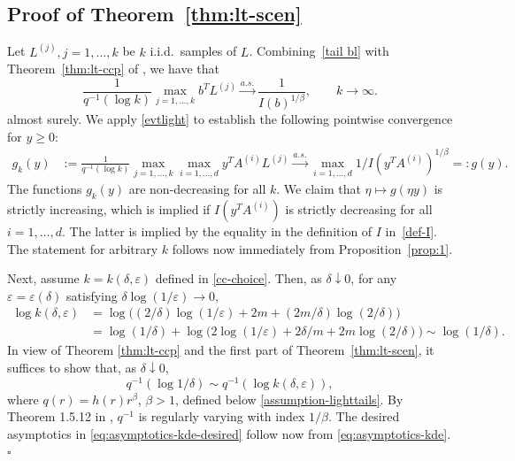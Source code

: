 \documentclass[a4paper, a4wide, 10pt, reqno]{amsart}
\theoremstyle{plain}
\renewcommand{\qed}{\hfill$\square$}
\begin{document}
\subsection{Proof of Theorem~\ref{thm:lt-scen}}
Let $L^{(j)},j=1,...,k$ be $k$ i.i.d.\ samples of $L$.
Combining~\eqref{tail bl} with Theorem~\ref{thm:lt-ccp} of
\cite{Resnick1973}, 
 we have that
\begin{equation}
\label{evtlight}
    \frac 1{q^{-1} (\log k)} \max_{j=1,...,k} b^T L^{(j)}\stackrel{a.s.}{\rightarrow} \frac  1{I(b)^{1/\beta}}, \qquad k\to\infty.
\end{equation}
almost surely.
We apply \eqref{evtlight} to establish the following pointwise convergence for $y\ge 0$:
\begin{align}
    g_k(y) &:=\frac 1{q^{-1} (\log k)} \max_{j=1,...,k}  \max_{i=1,...,d}y^TA^{(i)} L^{(j)}
    \stackrel{a.s.}\rightarrow \max_{i=1,...,d} 1/I(y^T A^{(i)})^{1/\beta}
    =: g(y).
\end{align}
The functions $g_k(y)$ are non-decreasing for all $k$. We claim that $\eta \mapsto g(\eta y)$ is strictly increasing, which is implied if $I(y^T A^{(i)})$ is strictly decreasing for all $i=1,\ldots, d$. The latter is implied by the equality in the definition of $I$ in~\eqref{def-I}.
The statement for arbitrary $k$ follows now immediately from Proposition~\ref{prop:1}. 

Next, assume $k=k(\delta, \varepsilon)$  defined in \eqref{cc-choice}. Then, as $\delta\downarrow 0$, for any $\varepsilon=\varepsilon(\delta)$ satisfying $\delta\log(1/\varepsilon)\to0$,
\begin{align}
    \log k(\delta, \varepsilon)&= \log\big((2/\delta)\log(1/\varepsilon)+2m +(2m/\delta)\log(2/\delta)\big)\nonumber \\
    &= \log(1/\delta) + \log\big(2\log(1/\varepsilon)+ 2\delta/m + 2m\log(2/\delta)\big) \sim \log (1/\delta).\label{eq:asymptotics-kde}
\end{align}
 In view of Theorem \ref{thm:lt-ccp} and the first part of Theorem~\ref{thm:lt-scen}, it suffices to show that, as $\delta\downarrow 0$,
\begin{equation}\label{eq:asymptotics-kde-desired}
q^{-1}(\log 1/\delta)\sim q^{-1}(\log k(\delta, \varepsilon)),
\end{equation}
where $q(r)=h(r)r^\beta$, $\beta>1$, defined below \eqref{assumption-lighttails}.
By Theorem 1.5.12 in \cite{Bingham_Goldie_Teugels_1987}, $q^{-1}$ is regularly varying with index $1/\beta$. The desired asymptotics in \eqref{eq:asymptotics-kde-desired} follow now from \eqref{eq:asymptotics-kde}.
\qed
\end{document}
